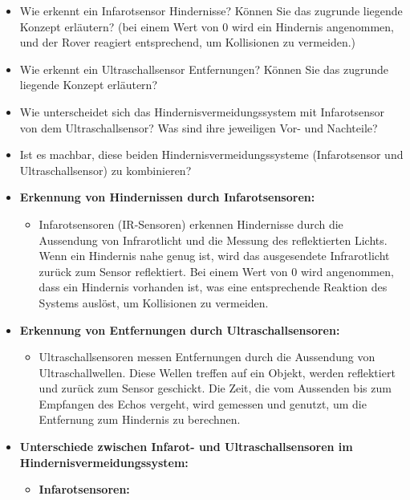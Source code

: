 \documentclass{vorlage-design-main}
\begin{document}
\begin{itemize}
\item
  Wie erkennt ein Infarotsensor Hindernisse? Können Sie das zugrunde
  liegende Konzept erläutern? (bei einem Wert von 0 wird ein Hindernis
  angenommen, und der Rover reagiert entsprechend, um Kollisionen zu
  vermeiden.)
\item
  Wie erkennt ein Ultraschallsensor Entfernungen? Können Sie das
  zugrunde liegende Konzept erläutern?
\item
  Wie unterscheidet sich das Hindernisvermeidungssystem mit
  Infarotsensor von dem Ultraschallsensor? Was sind ihre jeweiligen Vor-
  und Nachteile?
\item
  Ist es machbar, diese beiden Hindernisvermeidungssysteme
  (Infarotsensor und Ultraschallsensor) zu kombinieren?
\item
  \textbf{Erkennung von Hindernissen durch Infarotsensoren:}

  \begin{itemize}
  
  \item
    Infarotsensoren (IR-Sensoren) erkennen Hindernisse durch die
    Aussendung von Infrarotlicht und die Messung des reflektierten
    Lichts. Wenn ein Hindernis nahe genug ist, wird das ausgesendete
    Infrarotlicht zurück zum Sensor reflektiert. Bei einem Wert von 0
    wird angenommen, dass ein Hindernis vorhanden ist, was eine
    entsprechende Reaktion des Systems auslöst, um Kollisionen zu
    vermeiden.
  \end{itemize}
\item
  \textbf{Erkennung von Entfernungen durch Ultraschallsensoren:}

  \begin{itemize}
  
  \item
    Ultraschallsensoren messen Entfernungen durch die Aussendung von
    Ultraschallwellen. Diese Wellen treffen auf ein Objekt, werden
    reflektiert und zurück zum Sensor geschickt. Die Zeit, die vom
    Aussenden bis zum Empfangen des Echos vergeht, wird gemessen und
    genutzt, um die Entfernung zum Hindernis zu berechnen.
  \end{itemize}
\item
  \textbf{Unterschiede zwischen Infarot- und Ultraschallsensoren im
  Hindernisvermeidungssystem:}

  \begin{itemize}
  
  \item
    \textbf{Infarotsensoren:}


\end{itemize}
\end{itemize}
\end{document}
